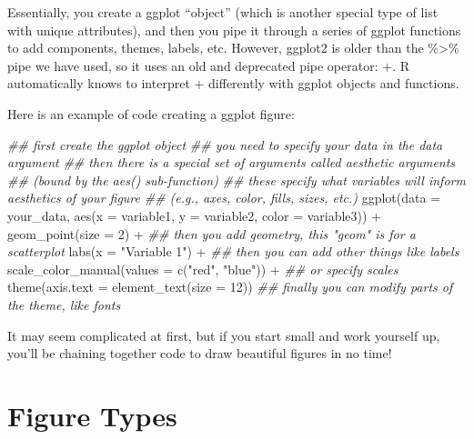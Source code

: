 \documentclass[
  letterpaper,
  DIV=11,
  numbers=noendperiod]{scrreprt}
\newenvironment{Shaded}{\begin{snugshade}}{\end{snugshade}}
\newcommand{\AttributeTok}[1]{\textcolor[rgb]{0.40,0.45,0.13}{#1}}
\newcommand{\DecValTok}[1]{\textcolor[rgb]{0.68,0.00,0.00}{#1}}
\newcommand{\DocumentationTok}[1]{\textcolor[rgb]{0.37,0.37,0.37}{\textit{#1}}}
\newcommand{\FunctionTok}[1]{\textcolor[rgb]{0.28,0.35,0.67}{#1}}
\newcommand{\NormalTok}[1]{\textcolor[rgb]{0.00,0.23,0.31}{#1}}
\newcommand{\SpecialCharTok}[1]{\textcolor[rgb]{0.37,0.37,0.37}{#1}}
\newcommand{\StringTok}[1]{\textcolor[rgb]{0.13,0.47,0.30}{#1}}
\begin{document}
Essentially, you create a ggplot ``object'' (which is another special
type of list with unique attributes), and then you pipe it through a
series of ggplot functions to add components, themes, labels, etc.
However, ggplot2 is older than the \%\textgreater\% pipe we have used,
so it uses an old and deprecated pipe operator: +. R automatically knows
to interpret + differently with ggplot objects and functions.

Here is an example of code creating a ggplot figure:

\begin{Shaded}
\begin{Highlighting}[]
\DocumentationTok{\#\# first create the ggplot object}
\DocumentationTok{\#\# you need to specify your data in the data argument}
\DocumentationTok{\#\# then there is a special set of arguments called aesthetic arguments}
\DocumentationTok{\#\# (bound by the aes() sub{-}function)}
\DocumentationTok{\#\# these specify what variables will inform aesthetics of your figure}
\DocumentationTok{\#\# (e.g., axes, color, fills, sizes, etc.)}
\FunctionTok{ggplot}\NormalTok{(}\AttributeTok{data =}\NormalTok{ your\_data, }\FunctionTok{aes}\NormalTok{(}\AttributeTok{x =}\NormalTok{ variable1, }\AttributeTok{y =}\NormalTok{ variable2, }\AttributeTok{color =}\NormalTok{ variable3)) }\SpecialCharTok{+}
  \FunctionTok{geom\_point}\NormalTok{(}\AttributeTok{size =} \DecValTok{2}\NormalTok{) }\SpecialCharTok{+} \DocumentationTok{\#\# then you add geometry, this "geom" is for a scatterplot}
  \FunctionTok{labs}\NormalTok{(}\AttributeTok{x =} \StringTok{"Variable 1"}\NormalTok{) }\SpecialCharTok{+} \DocumentationTok{\#\# then you can add other things like labels}
  \FunctionTok{scale\_color\_manual}\NormalTok{(}\AttributeTok{values =} \FunctionTok{c}\NormalTok{(}\StringTok{"red"}\NormalTok{, }\StringTok{"blue"}\NormalTok{)) }\SpecialCharTok{+} \DocumentationTok{\#\# or specify scales}
  \FunctionTok{theme}\NormalTok{(}\AttributeTok{axis.text =} \FunctionTok{element\_text}\NormalTok{(}\AttributeTok{size =} \DecValTok{12}\NormalTok{)) }\DocumentationTok{\#\# finally you can modify parts of the theme, like fonts}
\end{Highlighting}
\end{Shaded}

It may seem complicated at first, but if you start small and work
yourself up, you'll be chaining together code to draw beautiful figures
in no time!

\section{Figure Types}\label{figure-types}
\end{document}
